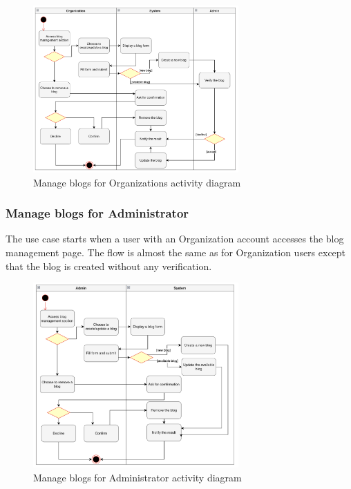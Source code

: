 \begin {figure}[H]
\centering
\includegraphics[width=0.7\textwidth]{Figures/manage_blog_org.png}
\caption{Manage blogs for Organizations activity diagram}
\label{fig:manage-blog}
\end{figure}

\subsubsection{Manage blogs for Administrator}

The use case starts when a user with an Organization account accesses the blog management page. The flow is almost the same as for Organization users except that the blog is created without any verification.

\begin {figure}[H]
\centering
\includegraphics[width=0.7\textwidth]{Figures/manage_blog_admin.png}
\caption{Manage blogs for Administrator activity diagram}
\label{fig:manage-blog-admin}
\end{figure}

